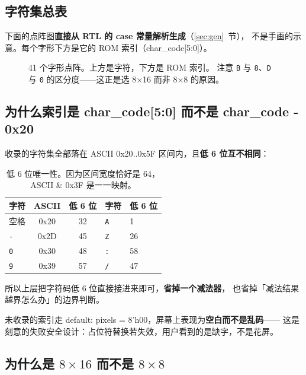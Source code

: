\documentclass[10pt,a4paper]{article}
\newcommand{\code}[1]{{\ttfamily\small #1}}
\begin{document}
\subsection{字符集总表}

下面的点阵图\textbf{直接从 RTL 的 \code{case} 常量解析生成}（\ref{sec:gen}~节），
不是手画的示意。每个字形下方是它的 ROM 索引（\code{char\_code[5:0]}）。

\begin{figure}[htbp]
\centering
\small

\caption{41 个字形点阵。上方是字符，下方是 ROM 索引。
注意 \texttt{B} 与 \texttt{8}、\texttt{D} 与 \texttt{0} 的区分度——这正是选 8×16 而非 8×8 的原因。}
\label{fig:glyphgrid}
\end{figure}

\subsection{为什么索引是 \code{char\_code[5:0]} 而不是 \code{char\_code - 0x20}}

收录的字符集全部落在 ASCII \code{0x20}..\code{0x5F} 区间内，且\textbf{低 6 位互不相同}：

\begin{table}[htbp]
\centering\small
\caption{低 6 位唯一性。因为区间宽度恰好是 64，\code{ASCII \& 0x3F} 是一一映射。}
\label{tab:low6}
\renewcommand{\arraystretch}{1.2}
\begin{tabular}{@{}l c c l l@{}}
\toprule
\textbf{字符} & \textbf{ASCII} & \textbf{低 6 位} & \textbf{字符} & \textbf{低 6 位}\\
\midrule
空格 & \code{0x20} & 32 & \texttt{A} & 1\\
\texttt{-}   & \code{0x2D} & 45 & \texttt{Z} & 26\\
\texttt{0}   & \code{0x30} & 48 & \texttt{:} & 58\\
\texttt{9}   & \code{0x39} & 57 & \texttt{/} & 47\\
\bottomrule
\end{tabular}
\end{table}

所以上层把字符码低 6 位直接接进来即可，\textbf{省掉一个减法器}，
也省掉「减法结果越界怎么办」的边界判断。

未收录的索引走 \code{default: pixels = 8'h00}，屏幕上表现为\textbf{空白而不是乱码}——
这是刻意的失败安全设计：占位符替换若失效，用户看到的是缺字，不是花屏。

\subsection{\texorpdfstring{为什么是 $8\times16$ 而不是 $8\times8$}{为什么是 8×16 而不是 8×8}}
\label{sec:why816}
\end{document}
